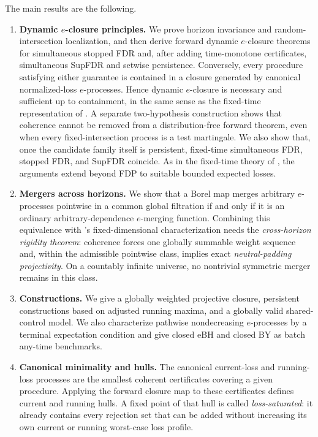 \documentclass[11pt]{article}
\numberwithin{equation}{section}
\theoremstyle{plain}
\theoremstyle{definition}
\begin{document}
The main results are the following.
\begin{enumerate}
\item \textbf{Dynamic $e$-closure principles.} We prove horizon invariance and random-intersection localization, and then derive forward dynamic $e$-closure theorems for simultaneous stopped FDR and, after adding time-monotone certificates, simultaneous SupFDR and setwise persistence. Conversely, every procedure satisfying either guarantee is contained in a closure generated by canonical normalized-loss $e$-processes. Hence dynamic $e$-closure is necessary and sufficient up to containment, in the same sense as the fixed-time representation of \citet{XuEtAl2026Closure}. A separate two-hypothesis construction shows that coherence cannot be removed from a distribution-free forward theorem, even when every fixed-intersection process is a test martingale. We also show that, once the candidate family itself is persistent, fixed-time simultaneous FDR, stopped FDR, and SupFDR coincide. As in the fixed-time theory of \citet{XuEtAl2026Closure}, the arguments extend beyond FDP to suitable bounded expected losses.
\item \textbf{Mergers across horizons.} We show that a Borel map merges arbitrary $e$-processes pointwise in a common global filtration if and only if it is an ordinary arbitrary-dependence $e$-merging function. Combining this equivalence with \citeauthor{Wang2025Merging}'s fixed-dimensional characterization needs the \emph{cross-horizon rigidity theorem}: coherence forces one globally summable weight sequence and, within the admissible pointwise class, implies exact \emph{neutral-padding projectivity}. On a countably infinite universe, no nontrivial symmetric merger remains in this class.

\item \textbf{Constructions.} We give a globally weighted projective closure, persistent constructions based on adjusted running maxima, and a globally valid shared-control model. We also characterize pathwise nondecreasing $e$-processes by a terminal expectation condition and give closed eBH and closed BY as batch any-time benchmarks.

\item \textbf{Canonical minimality and hulls.} The canonical current-loss and running-loss processes are the smallest coherent certificates covering a given procedure. Applying the forward closure map to these certificates defines current and running hulls. A fixed point of that hull is called \emph{loss-saturated}: it already contains every rejection set that can be added without increasing its own current or running worst-case loss profile.

\end{enumerate}
\end{document}
